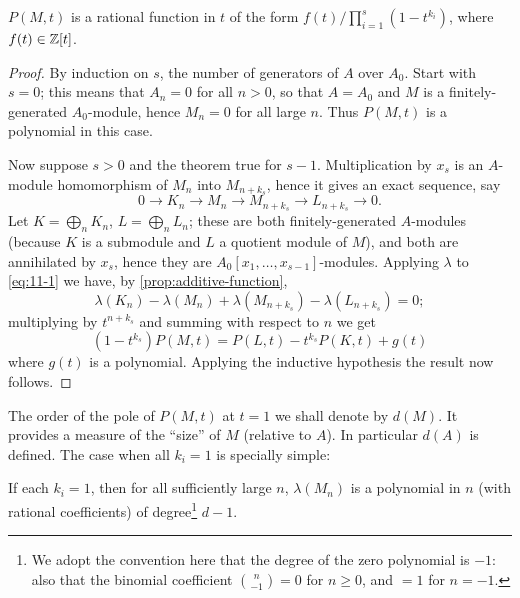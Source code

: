 \begin{theorem}\label{thm:hilbert-serre}
$P(M, t)$ is a rational function in $t$ of the form $f(t)/\prod_{i=1}^s (1 - t^{k_i})$, where $f(t) \in \mathbb{Z}[t]$.
\end{theorem}

\begin{proof}
By induction on $s$, the number of generators of $A$ over $A_0$. Start with $s = 0$; this means that $A_n = 0$ for all $n > 0$, so that $A = A_0$ and $M$ is a finitely-generated $A_0$-module, hence $M_n = 0$ for all large $n$. Thus $P(M, t)$ is a polynomial in this case.

Now suppose $s > 0$ and the theorem true for $s - 1$. Multiplication by $x_s$ is an $A$-module homomorphism of $M_n$ into $M_{n+k_s}$, hence it gives an exact sequence, say
\begin{equation}\label{eq:11-1}
    0 \longrightarrow K_n \longrightarrow M_n \longrightarrow M_{n+k_s} \longrightarrow L_{n+k_s} \longrightarrow 0. \tag{1}
\end{equation}
Let $K = \bigoplus_n K_n$, $L = \bigoplus_n L_n$; these are both finitely-generated $A$-modules (because $K$ is a submodule and $L$ a quotient module of $M$), and both are annihilated by $x_s$, hence they are $A_0[x_1, \ldots, x_{s-1}]$-modules. Applying $\lambda$ to \eqref{eq:11-1} we have, by \eqref{prop:additive-function},
\[
    \lambda(K_n) - \lambda(M_n) + \lambda(M_{n+k_s}) - \lambda(L_{n+k_s}) = 0;
\]
multiplying by $t^{n+k_s}$ and summing with respect to $n$ we get
\begin{equation}\label{eq:11-2}
    (1 - t^{k_s})P(M, t) = P(L, t) - t^{k_s}P(K, t) + g(t) \tag{2}
\end{equation}
where $g(t)$ is a polynomial. Applying the inductive hypothesis the result now follows.
\end{proof}

The order of the pole of $P(M, t)$ at $t = 1$ we shall denote by $d(M)$. It provides a measure of the ``size'' of $M$ (relative to $A$). In particular $d(A)$ is defined. The case when all $k_i = 1$ is specially simple:

\begin{corollary}\label{cor:hilbert-polynomial}
If each $k_i = 1$, then for all sufficiently large $n$, $\lambda(M_n)$ is a polynomial in $n$ (with rational coefficients) of degree\footnote{We adopt the convention here that the degree of the zero polynomial is $-1$: also that the binomial coefficient $\binom{n}{-1} = 0$ for $n \geq 0$, and $= 1$ for $n = -1$.} $d - 1$.
\end{corollary}


